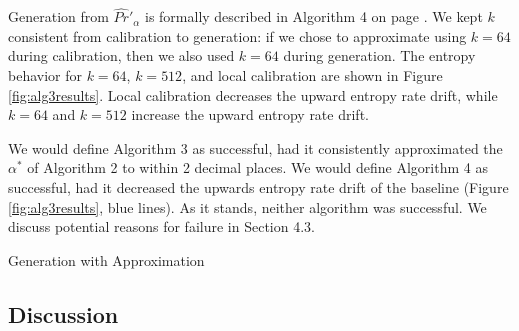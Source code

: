 \documentclass[pageno]{jpaper}
\makeatletter
\let\save@mathaccent\mathaccent
\newcommand*\if@single[3]{%
  \setbox0\hbox{${\mathaccent"0362{#1}}^H$}%
  \setbox2\hbox{${\mathaccent"0362{\kern0pt#1}}^H$}%
  \ifdim\ht0=\ht2 #3\else #2\fi
  }
\newcommand*\rel@kern[1]{\kern#1\dimexpr\macc@kerna}
\newcommand*\widebar[1]{\@ifnextchar^{{\wide@bar{#1}{0}}}{\wide@bar{#1}{1}}}
\newcommand*\wide@bar[2]{\if@single{#1}{\wide@bar@{#1}{#2}{1}}{\wide@bar@{#1}{#2}{2}}}
\newcommand*\wide@bar@[3]{%
  \begingroup
  \def\mathaccent##1##2{%
    \let\mathaccent\save@mathaccent
    \if#32 \let\macc@nucleus\first@char \fi
    \setbox\z@\hbox{$\macc@style{\macc@nucleus}_{}$}%
    \setbox\tw@\hbox{$\macc@style{\macc@nucleus}{}_{}$}%
    \dimen@\wd\tw@
    \advance\dimen@-\wd\z@
    \divide\dimen@ 3
    \@tempdima\wd\tw@
    \advance\@tempdima-\scriptspace
    \divide\@tempdima 10
    \advance\dimen@-\@tempdima
    \ifdim\dimen@>\z@ \dimen@0pt\fi
    \rel@kern{0.6}\kern-\dimen@
    \if#31
      \overline{\rel@kern{-0.6}\kern\dimen@\macc@nucleus\rel@kern{0.4}\kern\dimen@}%
      \advance\dimen@0.4\dimexpr\macc@kerna
      \let\final@kern#2%
      \ifdim\dimen@<\z@ \let\final@kern1\fi
      \if\final@kern1 \kern-\dimen@\fi
    \else
      \overline{\rel@kern{-0.6}\kern\dimen@#1}%
    \fi
  }%
  \macc@depth\@ne
  \let\math@bgroup\@empty \let\math@egroup\macc@set@skewchar
  \mathsurround\z@ \frozen@everymath{\mathgroup\macc@group\relax}%
  \macc@set@skewchar\relax
  \let\mathaccentV\macc@nested@a
  \if#31
    \macc@nested@a\relax111{#1}%
  \else
    \def\gobble@till@marker##1\endmarker{}%
    \futurelet\first@char\gobble@till@marker#1\endmarker
    \ifcat\noexpand\first@char A\else
      \def\first@char{}%
    \fi
    \macc@nested@a\relax111{\first@char}%
  \fi
  \endgroup
}
\makeatother
\begin{document}
Generation from $\widehat{Pr}'_\alpha$ is formally described in Algorithm 4 on page \pageref{alg4}. We kept $k$ consistent from calibration to generation: if we chose to approximate using $k=64$ during calibration, then we also used $k=64$ during generation. The entropy behavior for $k=64$, $k=512$, and local calibration are shown in Figure \ref{fig:alg3results}. Local calibration decreases the upward entropy rate drift, while $k=64$ and $k=512$ increase the upward entropy rate drift. 

We would define Algorithm 3 as successful, had it consistently approximated the $\alpha^*$ of Algorithm 2 to within 2 decimal places. We would define Algorithm 4 as successful, had it decreased the upwards entropy rate drift of the baseline (Figure \ref{fig:alg3results}, blue lines). As it stands, neither algorithm was successful. We discuss potential reasons for failure in Section 4.3.

\begin{algorithm}
    \renewcommand{\thealgorithm}{4}
    \caption{Generation with Approximation}
    \label{alg4}
\end{algorithm}

\subsection{Discussion}
\end{document}
